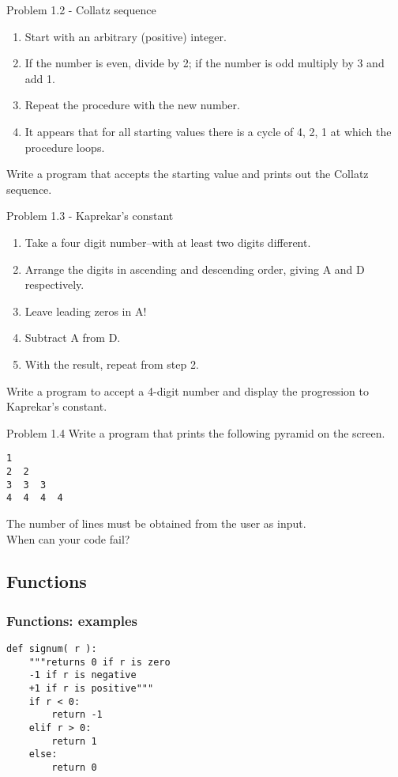 \documentclass[14pt,compress]{beamer}
\newcounter{time}
\newcommand{\inctime}[1]{\addtocounter{time}{#1}{\tiny \thetime\ m}}
\begin{document}
\begin{frame}{Problem 1.2 - Collatz sequence}
\begin{enumerate}
  \item Start with an arbitrary (positive) integer. 
  \item If the number is even, divide by 2; if the number is odd multiply by 3 and add 1.
  \item Repeat the procedure with the new number.
  \item It appears that for all starting values there is a cycle of 4, 2, 1 at which the procedure loops.
\end{enumerate}
    Write a program that accepts the starting value and prints out the Collatz sequence.

\end{frame}

\begin{frame}{Problem 1.3 - Kaprekar's constant}
  \begin{enumerate}
    \item Take a four digit number--with at least two digits different.
    \item Arrange the digits in ascending and descending order, giving A and D respectively.
    \item Leave leading zeros in A!
    \item Subtract A from D.
    \item With the result, repeat from step 2.
  \end{enumerate}
  Write a program to accept a 4-digit number and display the progression to Kaprekar's constant.
\end{frame}

\begin{frame}[fragile]{Problem 1.4}
  Write a program that prints the following pyramid on the screen. 
  \begin{lstlisting}
1
2  2
3  3  3
4  4  4  4
  \end{lstlisting}
The number of lines must be obtained from the user as input.\\
\pause
When can your code fail?
\only<2->{\inctime{25}}
\end{frame}


\subsection{Functions}
\begin{frame}[fragile]
\frametitle{Functions: examples}
  \begin{lstlisting}
def signum( r ):
    """returns 0 if r is zero
    -1 if r is negative
    +1 if r is positive"""
    if r < 0:
        return -1
    elif r > 0:
        return 1
    else:
        return 0
  \end{lstlisting}
\end{frame}
\end{document}
